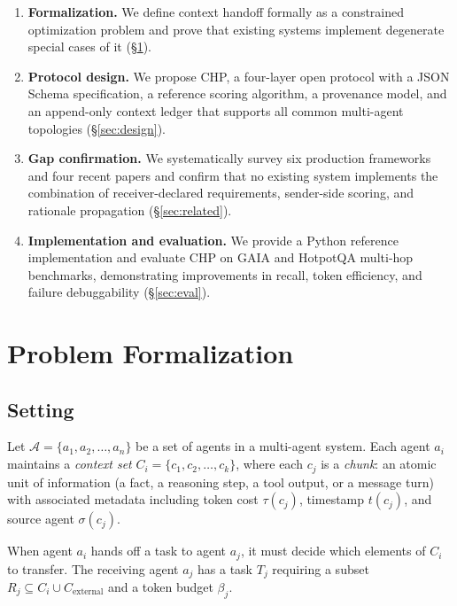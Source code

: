 \documentclass[11pt]{article}
\begin{document}
\begin{enumerate}[label=(\arabic*)]
  \item \textbf{Formalization.} We define context handoff formally as a
    constrained optimization problem and prove that existing systems implement
    degenerate special cases of it (\S\ref{sec:formalization}).

  \item \textbf{Protocol design.} We propose CHP, a four-layer open protocol
    with a JSON Schema specification, a reference scoring algorithm, a
    provenance model, and an append-only context ledger that supports all
    common multi-agent topologies (\S\ref{sec:design}).

  \item \textbf{Gap confirmation.} We systematically survey six production
    frameworks and four recent papers and confirm that no existing system
    implements the combination of receiver-declared requirements, sender-side
    scoring, and rationale propagation (\S\ref{sec:related}).

  \item \textbf{Implementation and evaluation.} We provide a Python reference
    implementation and evaluate CHP on GAIA and HotpotQA multi-hop benchmarks,
    demonstrating improvements in recall, token efficiency, and failure
    debuggability (\S\ref{sec:eval}).
\end{enumerate}

\section{Problem Formalization}
\label{sec:formalization}

\subsection{Setting}

Let $\mathcal{A} = \{a_1, a_2, \ldots, a_n\}$ be a set of agents in a
multi-agent system. Each agent $a_i$ maintains a \emph{context set}
$C_i = \{c_1, c_2, \ldots, c_k\}$, where each $c_j$ is a \emph{chunk}: an
atomic unit of information (a fact, a reasoning step, a tool output, or a
message turn) with associated metadata including token cost $\tau(c_j)$,
timestamp $t(c_j)$, and source agent $\sigma(c_j)$.

When agent $a_i$ hands off a task to agent $a_j$, it must decide which
elements of $C_i$ to transfer. The receiving agent $a_j$ has a task $T_j$
requiring a subset $R_j \subseteq C_i \cup C_{\text{external}}$ and a token
budget $\beta_j$.
\end{document}
